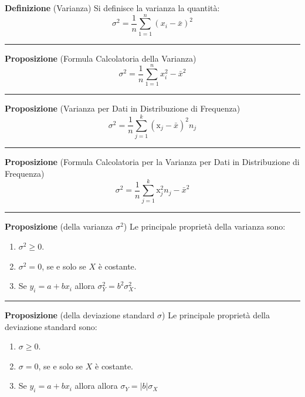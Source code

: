 \documentclass[
  11pt,
]{book}
\providecommand{\tightlist}{%
  \setlength{\itemsep}{0pt}\setlength{\parskip}{0pt}}
\theoremstyle{mytheoremstyle}
\theoremstyle{mydefstyle}
\begin{document}
\textbf{Definizione} (Varianza)
Si definisce la varianza la quantità:
\[
\sigma^2=\frac 1 n \sum_{1=1}^n(x_i-\bar x)^2
\]

\begin{center}\rule{0.5\linewidth}{0.5pt}\end{center}

\textbf{Proposizione} (Formula Calcolatoria della Varianza)
\[
\sigma^2=\frac 1 n \sum_{1=1}^n x_i^2 -\bar x^2
\]

\begin{center}\rule{0.5\linewidth}{0.5pt}\end{center}

\textbf{Proposizione} (Varianza per Dati in Distribuzione di Frequenza)
\[
\sigma^2=\frac 1 n\sum_{j=1}^k(\mathrm{x}_j-\bar x)^2n_j
\]

\begin{center}\rule{0.5\linewidth}{0.5pt}\end{center}

\textbf{Proposizione} (Formula Calcolatoria per la Varianza per Dati in Distribuzione di Frequenza)
\[
\sigma^2=\frac 1 n\sum_{j=1}^k\mathrm{x}_j^2n_j-\bar x^2
\]

\begin{center}\rule{0.5\linewidth}{0.5pt}\end{center}

\textbf{Proposizione} (della varianza \(\sigma^{2}\))
Le principale proprietà della varianza sono:

\begin{enumerate}
\def\labelenumi{\arabic{enumi}.}
\tightlist
\item
  \(\sigma^{2} \ge 0\).
\item
  \(\sigma^{2}=0\), se e solo se \(X\) è costante.
\item
  Se \(y_i=a+bx_i\) allora \(\sigma^{2}_Y = b^{2} \sigma^{2}_X\).
\end{enumerate}

\begin{center}\rule{0.5\linewidth}{0.5pt}\end{center}

\textbf{Proposizione} (della deviazione standard \(\sigma\))
Le principale proprietà della deviazione standard sono:

\begin{enumerate}
\def\labelenumi{\arabic{enumi}.}
\tightlist
\item
  \(\sigma\ge 0\).
\item
  \(\sigma=0\), se e solo se \(X\) è costante.
\item
  Se \(y_i=a+bx_i\) allora allora \(\sigma_Y = |b|\sigma_X\)
\end{enumerate}
\end{document}
